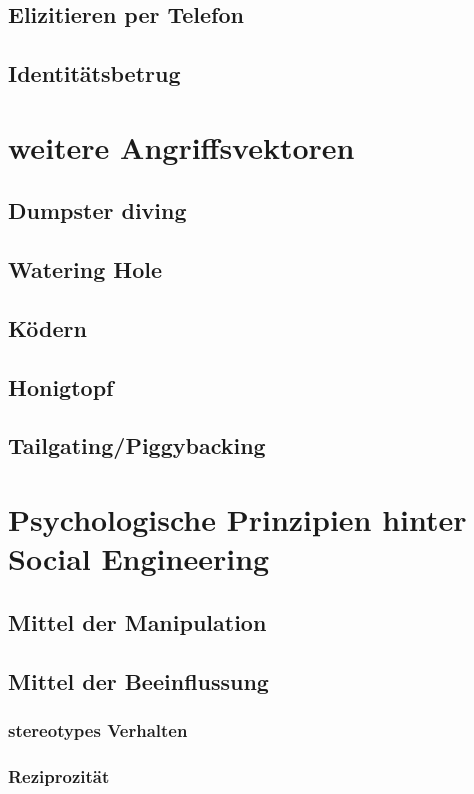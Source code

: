 \subsection{Elizitieren per Telefon}
\subsection{Identitätsbetrug}


\section{weitere Angriffsvektoren}

\subsection{Dumpster diving}
\subsection{Watering Hole}
\subsection{Ködern}
\subsection{Honigtopf}
\subsection{Tailgating/Piggybacking}


\section{Psychologische Prinzipien hinter Social Engineering}

\subsection{Mittel der Manipulation}

\subsection{Mittel der Beeinflussung}

\subsubsection{stereotypes Verhalten}
\subsubsection{Reziprozität}
